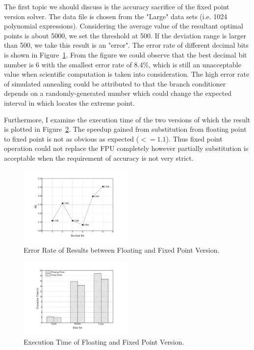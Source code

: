 The first topic we should discuss is the accuracy sacrifice of the fixed point version solver. The data file is chosen from the "Large" data sets (i.e. 1024 polynomial expressions). Considering the average value of the resultant optimal points is about 5000, we set the threshold at 500. If the deviation range is larger than 500, we take this result is an "error". The error rate of different decimal bits is shown in Figure~\ref{fig:ER}. From the figure we could observe that the best decimal bit number is 6 with the smallest error rate of 8.4\%, which is still an unacceptable value when scientific computation is taken into consideration. The high error rate of simulated annealing could be attributed to that the branch conditioner depends on a randomly-generated number which could change the expected interval in which locates the extreme point.

Furthermore, I examine the execution time of the two versions of which the result is plotted in Figure~\ref{fig:execution_time}. The speedup gained from substitution from floating point to fixed point is not as obvious as expected ($<=1.1$). Thus fixed point operation could not replace the FPU completely however partially substitution is acceptable when the requirement of accuracy is not very strict.

\begin{figure}[ht]
\centering
\includegraphics[width=0.50\textwidth]{graph/ER.pdf}
\caption{Error Rate of Results between Floating and Fixed Point Version.}
\label{fig:ER}
\end{figure}

\begin{figure}[ht]
\centering
\includegraphics[width=0.50\textwidth]{graph/execution_time.pdf}
\caption{Execution Time of Floating and Fixed Point Version.}
\label{fig:execution_time}
\end{figure} 